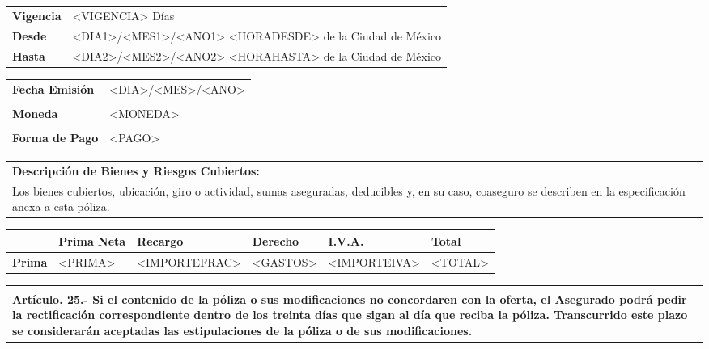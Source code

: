 \documentclass[letterpaper,10pt]{article}
\begin{document}
\hspace{1cm}\\
\begin{tabularx}{0.5\textwidth}{|l|X|}
    \hline
    \textbf{Vigencia} & <VIGENCIA> Días\\
    \textbf{Desde} & <DIA1>/<MES1>/<ANO1> <HORADESDE> de la Ciudad de México\\
    \textbf{Hasta} & <DIA2>/<MES2>/<ANO2> <HORAHASTA> de la Ciudad de México\\
    \hline
\end{tabularx}
\begin{tabularx}{0.5\textwidth}{|l|X|}
    \hline
    \textbf{Fecha Emisión} & <DIA>/<MES>/<ANO>\\
    &\\
    \textbf{Moneda} & <MONEDA>\\
    &\\
    \textbf{Forma de Pago} & <PAGO>\\
    \hline
\end{tabularx}

\begin{center}
    \begin{tabularx}{\textwidth}{|X|}
        \hline
        \textbf{Descripción de Bienes y Riesgos Cubiertos:}\\
        Los bienes cubiertos, ubicación, giro o actividad, sumas aseguradas, deducibles y, en su caso, coaseguro se describen en la especificación anexa a esta póliza.\\
        \hline
    \end{tabularx}
\end{center}

\begin{center}
    \begin{tabularx}{\textwidth}{|l|Y|Y|Y|Y|Y|}
        \hline
          & \textbf{Prima Neta} & \textbf{Recargo} & \textbf{Derecho} & \textbf{I.V.A.} &\textbf{Total}\\\hline
        \textbf{Prima} & <PRIMA> & <IMPORTEFRAC> & <GASTOS> & <IMPORTEIVA> & <TOTAL>\\
        \hline
    \end{tabularx}
\end{center}

\begin{center}
    \begin{tabularx}{\textwidth}{|X|}
        \hline
        \textbf{}\\
        \vspace{0.1cm}
        \textbf{Artículo. 25.- Si el contenido de la póliza o sus modificaciones no concordaren con la oferta, el Asegurado podrá pedir la rectificación correspondiente dentro de los treinta días que sigan al día que reciba la póliza. Transcurrido este plazo se considerarán aceptadas las estipulaciones de la póliza o de sus modificaciones.}\\
        \hline
    \end{tabularx}
\end{center}
\end{document}

